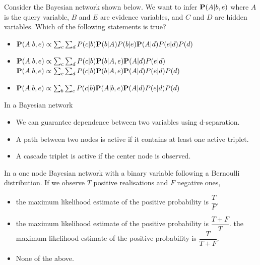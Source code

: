 \documentclass[11pt, a4paper]{article}
\begin{document}
Consider the Bayesian network shown below. We want to infer ${\bf P}(A | b, e)$ where $A$ is the query variable, $B$ and $E$ are evidence variables, and $C$ and $D$ are hidden variables. Which of the following statements is true?
\begin{center}
\end{center}
\begin{itemize}
    \item ${\bf P}(A | b, e) \propto \sum_c \sum_d P(c|b) {\bf P}(b | A) P(b|e) {\bf P}(A | d) P(e|d) P(d)$
    \item ${\bf P}(A | b, e) \propto \sum_c \sum_d P(c|b) {\bf P}(b | A, e) {\bf P}(A|d) P(e|d)$
    \solitem ${\bf P}(A | b, e) \propto \sum_c \sum_d P(c|b) {\bf P}(b | A, e) {\bf P}(A | d) P(e|d) P(d)$ %
    \item ${\bf P}(A | b, e) \propto \sum_b \sum_e P(c | b) {\bf P}(A | b,e) {\bf P}(A | d) P(e|d) P(d)$
\end{itemize}

In a Bayesian network
\begin{itemize}
    \solitem Independence between two variables is guaranteed if all path connecting them are inactive.
    \item We can guarantee dependence between two variables using d-separation.
    \item A path between two nodes is active if it contains at least one active triplet.
    \item A cascade triplet is active if the center node is observed.
\end{itemize}

In a one node Bayesian network with a binary variable following a Bernoulli distribution. If we observe $T$ positive realisations and $F$ negative ones,
\begin{itemize}
    \item the maximum likelihood estimate of the positive probability is $\dfrac{T}{F}$.
    \item the maximum likelihood estimate of the positive probability is $\dfrac{T + F}{T}$.
    \solitem the maximum likelihood estimate of the positive probability is $\dfrac{T}{T + F}$.
    \item None of the above.
\end{itemize}
\end{document}
